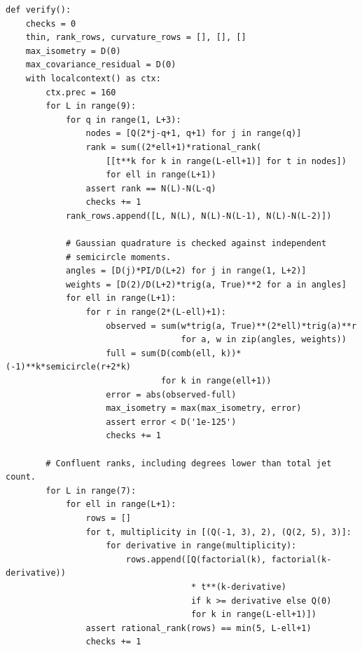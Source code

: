 \documentclass[aps,prd,reprint,amsmath,amssymb,nofootinbib,
longbibliography]{revtex4-2}
\begin{document}
\begin{lstlisting}
def verify():
    checks = 0
    thin, rank_rows, curvature_rows = [], [], []
    max_isometry = D(0)
    max_covariance_residual = D(0)
    with localcontext() as ctx:
        ctx.prec = 160
        for L in range(9):
            for q in range(1, L+3):
                nodes = [Q(2*j-q+1, q+1) for j in range(q)]
                rank = sum((2*ell+1)*rational_rank(
                    [[t**k for k in range(L-ell+1)] for t in nodes])
                    for ell in range(L+1))
                assert rank == N(L)-N(L-q)
                checks += 1
            rank_rows.append([L, N(L), N(L)-N(L-1), N(L)-N(L-2)])

            # Gaussian quadrature is checked against independent
            # semicircle moments.
            angles = [D(j)*PI/D(L+2) for j in range(1, L+2)]
            weights = [D(2)/D(L+2)*trig(a, True)**2 for a in angles]
            for ell in range(L+1):
                for r in range(2*(L-ell)+1):
                    observed = sum(w*trig(a, True)**(2*ell)*trig(a)**r
                                   for a, w in zip(angles, weights))
                    full = sum(D(comb(ell, k))*(-1)**k*semicircle(r+2*k)
                               for k in range(ell+1))
                    error = abs(observed-full)
                    max_isometry = max(max_isometry, error)
                    assert error < D('1e-125')
                    checks += 1

        # Confluent ranks, including degrees lower than total jet count.
        for L in range(7):
            for ell in range(L+1):
                rows = []
                for t, multiplicity in [(Q(-1, 3), 2), (Q(2, 5), 3)]:
                    for derivative in range(multiplicity):
                        rows.append([Q(factorial(k), factorial(k-derivative))
                                     * t**(k-derivative)
                                     if k >= derivative else Q(0)
                                     for k in range(L-ell+1)])
                assert rational_rank(rows) == min(5, L-ell+1)
                checks += 1


\end{lstlisting}
\end{document}
